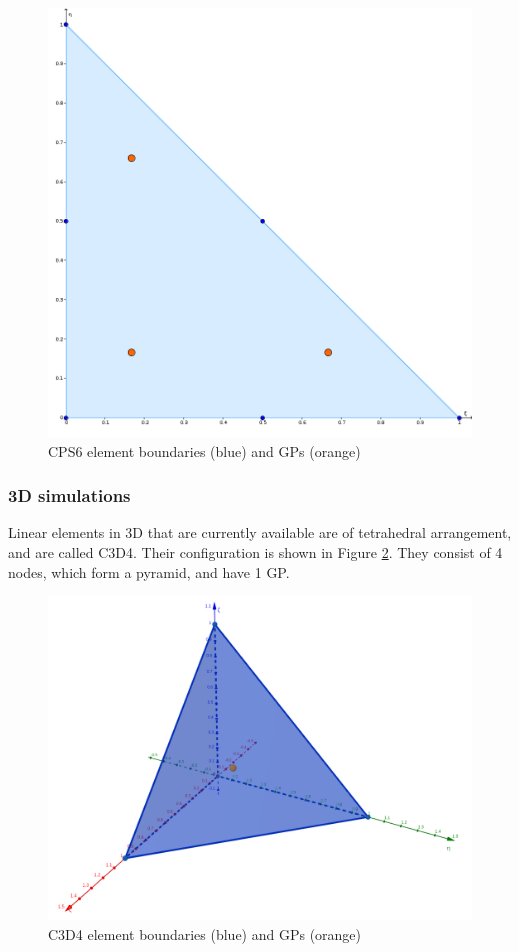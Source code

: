 \documentclass[oneside,11pt,times]{book}
\begin{document}
\begin{figure}[!htb]
\centering
 \includegraphics[scale=0.3]{imgs/SpatialDiscretisation/TriQuad.png}
 \caption{CPS6 element boundaries (blue) and GPs (orange)}
 \label{figureQuadTri}
\end{figure}

\subsubsection{3D simulations}
Linear elements in 3D that are currently available are of tetrahedral arrangement, and are called C3D4. Their configuration is shown in Figure \ref{figureLinTet}. They consist of 4 nodes, which form a pyramid, and have 1 GP.

\begin{figure}[!htb]
\centering
 \includegraphics[scale=0.3]{imgs/SpatialDiscretisation/TetLin.png}
 \caption{C3D4 element boundaries (blue) and GPs (orange)}
 \label{figureLinTet}
\end{figure}
\end{document}
